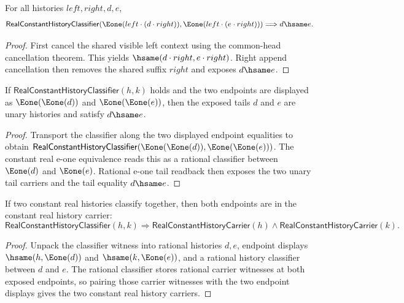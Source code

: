 \begin{theorem}
\label{thm:real-constant-history-classifier-append-common-context-cancel}
For all histories $left,right,d,e$,
$$
\mathsf{RealConstantHistoryClassifier}
(\Eone(left\cdot(d\cdot right)),\Eone(left\cdot(e\cdot right)))
\Longrightarrow d\hsame e.
$$
\end{theorem}
\begin{proof}
First cancel the shared visible left context using the common-head cancellation
theorem. This yields $\hsame(d\cdot right,e\cdot right)$. Right append
cancellation then removes the shared suffix $right$ and exposes $d\hsame e$.
\end{proof}

\begin{theorem}
\label{thm:real-constant-history-classifier-e1-pair-readback}
If $\mathsf{RealConstantHistoryClassifier}(h,k)$ holds and the two endpoints
are displayed as $\Eone(\Eone(d))$ and $\Eone(\Eone(e))$, then the exposed
tails $d$ and $e$ are unary histories and satisfy $d\hsame e$.
\end{theorem}
\begin{proof}
Transport the classifier along the two displayed endpoint equalities to obtain
$\mathsf{RealConstantHistoryClassifier}(\Eone(\Eone(d)),\Eone(\Eone(e)))$.
The constant real e-one equivalence reads this as a rational classifier
between $\Eone(d)$ and $\Eone(e)$. Rational e-one tail readback then exposes
the two unary tail carriers and the tail equality $d\hsame e$.
\end{proof}

\begin{theorem}
\label{thm:real-constant-history-classifier-endpoint-carriers}
If two constant real histories classify together, then both endpoints are in the
constant real history carrier:
$$
\mathsf{RealConstantHistoryClassifier}(h,k)
\Longrightarrow
\mathsf{RealConstantHistoryCarrier}(h)\land
\mathsf{RealConstantHistoryCarrier}(k).
$$
\end{theorem}
\begin{proof}
Unpack the classifier witness into rational histories $d,e$, endpoint displays
$\hsame(h,\Eone(d))$ and $\hsame(k,\Eone(e))$, and a rational history
classifier between $d$ and $e$. The rational classifier stores rational carrier
witnesses at both exposed endpoints, so pairing those carrier witnesses with the
two endpoint displays gives the two constant real history carriers.
\end{proof}

